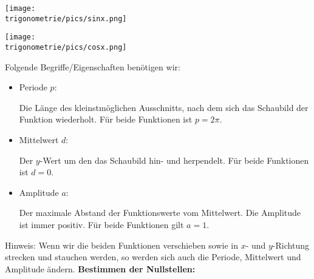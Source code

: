 \begin{minipage}{\textwidth}
	\texttt{[image: \\trigonometrie/pics/sinx.png]}
\end{minipage}%

\bigskip

\begin{minipage}{\textwidth}
	\texttt{[image: \\trigonometrie/pics/cosx.png]}
\end{minipage}%

\bigskip

Folgende Begriffe/Eigenschaften benötigen wir:
\begin{itemize}
	\item Periode \(p\):

	\textcolor{loes}{Die Länge des kleinstmöglichen Ausschnitts, nach dem sich das Schaubild der Funktion wiederholt. Für beide Funktionen ist \(p=2\pi\).}


	\item Mittelwert \(d\):

	\textcolor{loes}{Der \(y\)-Wert um den das Schaubild hin- und herpendelt. Für beide Funktionen ist \(d=0\).}


	\item Amplitude \(a\):

	\textcolor{loes}{Der maximale Abstand der Funktionswerte vom Mittelwert. Die Amplitude ist immer positiv. Für beide Funktionen gilt \(a=1\).}


\end{itemize}
Hinweis: Wenn wir die beiden Funktionen verschieben sowie in \(x\)- und \(y\)-Richtung strecken und stauchen werden, so werden sich auch die Periode, Mittelwert und Amplitude ändern.
\newpage
\textbf{Bestimmen der Nullstellen:}

